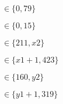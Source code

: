 \documentclass{article}
\begin{document}
$\in\lbrace 0,79 \rbrace$
\pagebreak

$\in\lbrace 0,15 \rbrace$
\pagebreak

$\in\lbrace 211,x2 \rbrace$
\pagebreak

$\in\lbrace x1+1,423 \rbrace$
\pagebreak

$\in\lbrace 160,y2 \rbrace$
\pagebreak

$\in\lbrace y1+1,319 \rbrace$
\pagebreak
\end{document}
